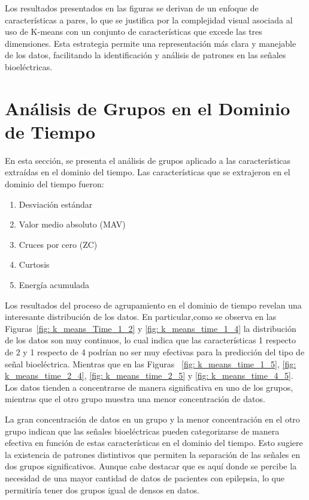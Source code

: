 Los resultados presentados en las figuras se derivan de un enfoque de características a pares, lo que se justifica por la complejidad visual asociada al uso de K-means con un conjunto de características que excede las tres dimensiones. Esta estrategia permite una representación más clara y manejable de los datos, facilitando la identificación y análisis de patrones en las señales bioeléctricas.

\section{Análisis de Grupos en el Dominio de Tiempo}
En esta sección, se presenta el análisis de grupos aplicado a las características extraídas en el dominio del tiempo. 
Las características que se extrajeron en el dominio del tiempo fueron:
\begin{enumerate}
    \item Desviación estándar
    \item Valor medio absoluto (MAV)
    \item Cruces por cero (ZC)
    \item Curtosis
    \item Energía acumulada
\end{enumerate}

Los resultados del proceso de agrupamiento en el dominio de tiempo revelan una interesante distribución de los datos. En particular,como se observa en las Figuras~\ref{fig: k_means_Time_1_2} y \ref{fig: k_means_time_1_4} la distribución de los datos son muy continuos, lo cual indica que las características 1 respecto de 2 y 1 respecto de 4 podrían no ser muy efectivas para la predicción del tipo de señal bioeléctrica. Mientras que en las Figuras ~\ref{fig: k_means_time_1_5}, \ref{fig: k_means_time_2_4}, \ref{fig: k_means_time_2_5} y \ref{fig: k_means_time_4_5}. Los datos tienden a concentrarse de manera significativa en uno de los grupos, mientras que el otro grupo muestra una menor concentración de datos. 

La gran concentración de datos en un grupo y la menor concentración en el otro grupo indican que las señales bioeléctricas pueden categorizarse de manera efectiva en función de estas características en el dominio del tiempo. Esto sugiere la existencia de patrones distintivos que permiten la separación de las señales en dos grupos significativos. Aunque cabe destacar que es aquí donde se percibe la necesidad de una mayor cantidad de datos de pacientes con epilepsia, lo que permitiría tener dos grupos igual de densos en datos. 

